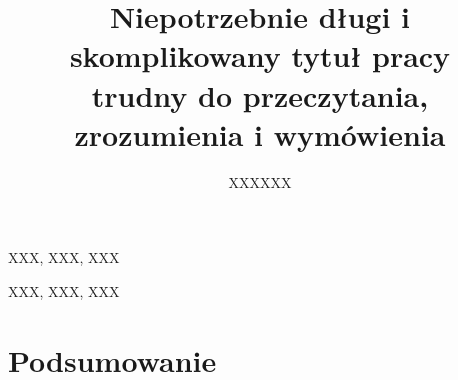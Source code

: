 \documentclass{eiti/eiti-inz}
\begin{document}
\title{Niepotrzebnie długi i skomplikowany tytuł pracy \\ trudny do przeczytania, zrozumienia i wymówienia}
\author{XXXXXX}
\date{\the\year}
\maketitle

\streszczenie \lipsum[1-3]
\slowakluczowe XXX, XXX, XXX
\newpage

\abstract \kant[1-3]
\keywords XXX, XXX, XXX
\newpage

\makeauthorship
\newpage

\thispagestyle{plain}
\tableofcontents
\newpage


\section{Podsumowanie}   %
\lipsum[5-8]

\newpage



\newpage
\listoffigures %
\vspace{5cm}   %
\listoftables  %
\end{document}
